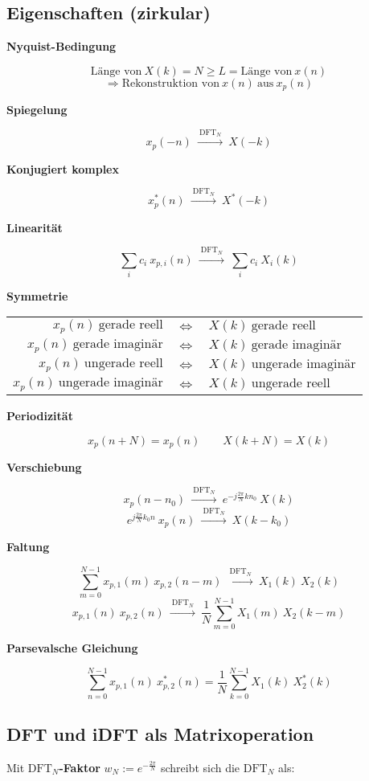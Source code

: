 \documentclass[10pt,a4paper]{article}
\newcommand{\fancyformula}[2]{
	\small\raggedright{\sffamily\textbf{#1}}
	#2
}
\newcommand{\dfttransform}{
	~\xrightarrow{~\mathrm{DFT}_N~}~
}
\begin{document}
\subsection*{Eigenschaften (zirkular)}
\vspace{-1.5em}
\begin{multicols}{2}
	\fancyformula{Nyquist-Bedingung}{
		\[ \text{Länge von} ~ X(k) = N \geq L = \text{Länge von} ~ x(n) \]
		\vspace{-2.0em}
		\[ \Longrightarrow \text{Rekonstruktion von} ~ x(n) ~ \text{aus} ~ x_p(n) \]
	}

	\fancyformula{Spiegelung}{
		\[x_p(-n) \dfttransform X(-k)\]
	}

	\fancyformula{Konjugiert komplex}{
		\[x^{*}_{p}(n)\dfttransform X^{*}(-k)\]
	}
	\fancyformula{Linearität}{
		\[ \sum_i c_i ~ x_{p, i}(n) \dfttransform \sum_i c_i ~ X_{i}(k) \]
	}

	\fancyformula{Symmetrie}{\begin{tabular}{r c l}
		$x_p(n) ~ \text{gerade reell}$ & $\Longleftrightarrow$ & $ X(k) ~ \text{gerade reell}$ \\
		$x_p(n) ~ \text{gerade imaginär}$ & $\Longleftrightarrow$ & $ X(k) ~ \text{gerade imaginär}$ \\
		$x_p(n) ~ \text{ungerade reell}$ & $\Longleftrightarrow$ & $ X(k) ~ \text{ungerade imaginär}$ \\
		$x_p(n) ~ \text{ungerade imaginär}$ & $\Longleftrightarrow$ & $X(k) ~ \text{ungerade reell}$
	\end{tabular}}

	\fancyformula{Periodizität}{
		\[ x_p(n + N) = x_p(n) \qquad X(k+N)=X(k) \]
	}

	\fancyformula{Verschiebung}{
		\[ x_p(n - n_0) \dfttransform e^{-j \frac{2\pi}{N} k n_0} ~ X(k) \]
		\[ e^{j\frac{2\pi}{N} k_0 n} ~ x_p(n)\dfttransform X(k - k_0)\]
	}

	\fancyformula{Faltung}{
		\[ \sum_{m = 0}^{N - 1} x_{p, 1}(m) ~ x_{p, 2}(n - m) \dfttransform X_{1}(k) ~ X_{2}(k)\]
		\[ x_{p, 1}(n) ~ x_{p, 2}(n) \dfttransform \frac{1}{N} \sum_{m = 0}^{N - 1} X_{1}(m) ~ X_{2}(k - m) \]
	}

	\fancyformula{Parsevalsche Gleichung}{
	\[ \sum_{n = 0}^{N - 1} x_{p, 1}(n) ~ x^{*}_{p, 2}(n) = \frac{1}{N} \sum_{k = 0}^{N - 1}X_{1}(k) ~ X^*_{2}(k) \]
	}
\end{multicols}

\subsection*{DFT und iDFT als Matrixoperation}
Mit \textbf{$\mathrm{DFT}_N$-Faktor} $w_N := e^{-\frac{2 \pi}{N}}$ schreibt sich die $\mathrm{DFT}_N$ als:
\end{document}
